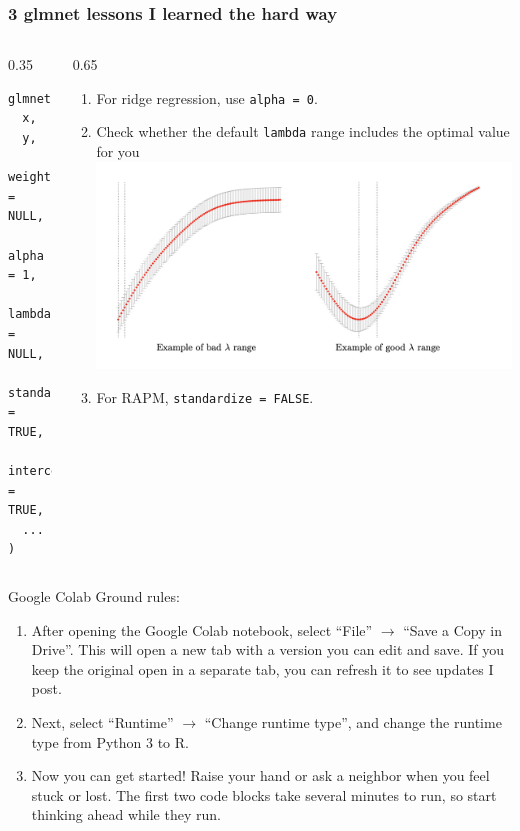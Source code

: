\documentclass{beamer}
\begin{document}
  \begin{frame}[fragile=singleslide]\frametitle{3 glmnet lessons I learned the hard way}
    \begin{columns}
      \begin{column}{0.35\textwidth}
        \begin{verbatim}
glmnet::glmnet(
  x,
  y,
  weights = NULL,
  alpha = 1,
  lambda = NULL,
  standardize = TRUE,
  intercept = TRUE,
  ...
)
        \end{verbatim}
      \end{column}
      \begin{column}{0.65\textwidth}
        \begin{enumerate}
          \item For ridge regression, use {\tt alpha = 0}.
          \item Check whether the default {\tt lambda} range includes the optimal value for you
            \includegraphics[width = \textwidth]{images/lambda_range.png}
          \item For RAPM, {\tt standardize = FALSE}.
        \end{enumerate}
      \end{column}
    \end{columns}
  \end{frame}

  \begin{frame}{Google Colab}
    Ground rules:
    \begin{enumerate}
      \item After opening the Google Colab notebook, select ``File'' $\rightarrow$ ``Save a Copy in Drive''. This will open a new tab with a version you can edit and save. If you keep the original open in a separate tab, you can refresh it to see updates I post.
      \item Next, select ``Runtime'' $\rightarrow$ ``Change runtime type'', and change the runtime type from Python 3 to R.
      \item Now you can get started! Raise your hand or ask a neighbor when you feel stuck or lost. The first two code blocks take several minutes to run, so start thinking ahead while they run.
    \end{enumerate}
  \end{frame}
\end{document}
